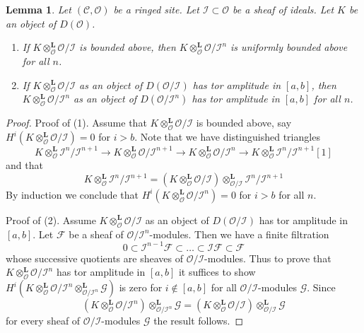 \documentclass[10pt,a4paper]{amsart}
\theoremstyle{plain}
\newtheorem{lemma}[subsection]{Lemma}
\theoremstyle{definition}
\theoremstyle{remark}
\numberwithin{equation}{subsection}
\begin{document}
\begin{lemma}
\label{lemma-bounded}
Let $(\mathcal{C}, \mathcal{O})$ be a ringed site.
Let $\mathcal{I} \subset \mathcal{O}$ be a sheaf of ideals.
Let $K$ be an object of $D(\mathcal{O})$.
\begin{enumerate}
\item If $K \otimes_\mathcal{O}^\mathbf{L} \mathcal{O}/\mathcal{I}$
is bounded above, then
$K \otimes_\mathcal{O}^\mathbf{L} \mathcal{O}/\mathcal{I}^n$
is uniformly bounded above for all $n$.
\item If $K \otimes_\mathcal{O}^\mathbf{L} \mathcal{O}/\mathcal{I}$
as an object of $D(\mathcal{O}/\mathcal{I})$ has tor amplitude in $[a, b]$,
then $K \otimes_\mathcal{O}^\mathbf{L} \mathcal{O}/\mathcal{I}^n$
as an object of $D(\mathcal{O}/\mathcal{I}^n)$
has tor amplitude in $[a, b]$ for all $n$.
\end{enumerate}
\end{lemma}

\begin{proof}
Proof of (1). Assume that
$K \otimes_\mathcal{O}^\mathbf{L} \mathcal{O}/\mathcal{I}$
is bounded above, say
$H^i(K \otimes_\mathcal{O}^\mathbf{L} \mathcal{O}/\mathcal{I}) = 0$
for $i > b$. Note that we have distinguished triangles
$$
K \otimes_\mathcal{O}^\mathbf{L}
\mathcal{I}^n/\mathcal{I}^{n + 1} \to
K \otimes_\mathcal{O}^\mathbf{L}
\mathcal{O}/\mathcal{I}^{n + 1} \to
K \otimes_\mathcal{O}^\mathbf{L}
\mathcal{O}/\mathcal{I}^n \to
K \otimes_\mathcal{O}^\mathbf{L}
\mathcal{I}^n/\mathcal{I}^{n + 1}[1]
$$
and that
$$
K \otimes_\mathcal{O}^\mathbf{L}
\mathcal{I}^n/\mathcal{I}^{n + 1} =
\left(
K \otimes_\mathcal{O}^\mathbf{L}
\mathcal{O}/\mathcal{I}\right)
\otimes_{\mathcal{O}/\mathcal{I}}^\mathbf{L}
\mathcal{I}^n/\mathcal{I}^{n + 1}
$$
By induction we conclude that
$H^i(K \otimes_\mathcal{O}^\mathbf{L} \mathcal{O}/\mathcal{I}^n) = 0$
for $i > b$ for all $n$.

\medskip\noindent
Proof of (2). Assume $K \otimes_\mathcal{O}^\mathbf{L} \mathcal{O}/\mathcal{I}$
as an object of $D(\mathcal{O}/\mathcal{I})$ has tor amplitude in $[a, b]$.
Let $\mathcal{F}$ be a sheaf of $\mathcal{O}/\mathcal{I}^n$-modules.
Then we have a finite filtration
$$
0 \subset \mathcal{I}^{n - 1}\mathcal{F} \subset \ldots
\subset \mathcal{I}\mathcal{F} \subset \mathcal{F}
$$
whose successive quotients are sheaves of $\mathcal{O}/\mathcal{I}$-modules.
Thus to prove that $K \otimes_\mathcal{O}^\mathbf{L} \mathcal{O}/\mathcal{I}^n$
has tor amplitude in $[a, b]$ it suffices to show
$H^i(K \otimes_\mathcal{O}^\mathbf{L} \mathcal{O}/\mathcal{I}^n
\otimes_{\mathcal{O}/\mathcal{I}^n}^\mathbf{L} \mathcal{G})$
is zero for $i \not \in [a, b]$ for all $\mathcal{O}/\mathcal{I}$-modules
$\mathcal{G}$. Since
$$
\left(K \otimes_\mathcal{O}^\mathbf{L} \mathcal{O}/\mathcal{I}^n\right)
\otimes_{\mathcal{O}/\mathcal{I}^n}^\mathbf{L} \mathcal{G}
=
\left(K \otimes_\mathcal{O}^\mathbf{L} \mathcal{O}/\mathcal{I}\right)
\otimes_{\mathcal{O}/\mathcal{I}}^\mathbf{L} \mathcal{G}
$$
for every sheaf of $\mathcal{O}/\mathcal{I}$-modules $\mathcal{G}$
the result follows.
\end{proof}
\end{document}
